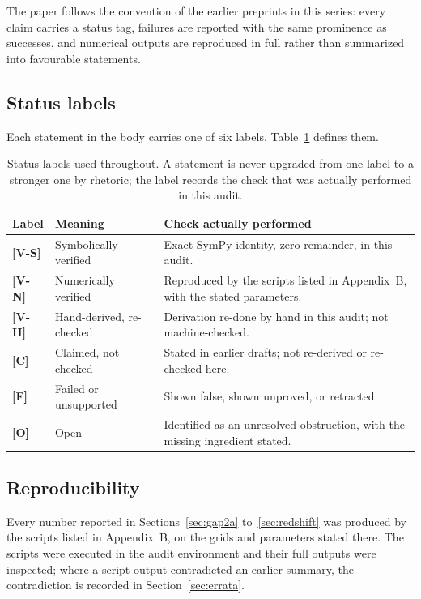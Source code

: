 \documentclass[11pt, a4paper]{article}
\newcommand{\VS}{\textcolor{vs}{\textbf{[V-S]}}}
\newcommand{\VN}{\textcolor{vn}{\textbf{[V-N]}}}
\newcommand{\VH}{\textcolor{vh}{\textbf{[V-H]}}}
\newcommand{\CC}{\textcolor{cc}{\textbf{[C]}}}
\newcommand{\FF}{\textcolor{ff}{\textbf{[F]}}}
\newcommand{\OO}{\textcolor{oo}{\textbf{[O]}}}
\theoremstyle{remark}
\theoremstyle{definition}
\begin{document}
The paper follows the convention of the earlier preprints in this series: every claim carries a status tag, failures are reported with the same prominence as successes, and numerical outputs are reproduced in full rather than summarized into favourable statements.

\subsection{Status labels}

Each statement in the body carries one of six labels. Table~\ref{tab:status} defines them.

\begin{table}[H]
\centering
\caption{Status labels used throughout. A statement is never upgraded from one label to a stronger one by rhetoric; the label records the check that was actually performed in this audit.}
\label{tab:status}
\begin{tabular}{@{}llp{8.6cm}@{}}
\toprule
Label & Meaning & Check actually performed \\
\midrule
\VS & Symbolically verified & Exact SymPy identity, zero remainder, in this audit. \\
\VN & Numerically verified & Reproduced by the scripts listed in Appendix~B, with the stated parameters. \\
\VH & Hand-derived, re-checked & Derivation re-done by hand in this audit; not machine-checked. \\
\CC & Claimed, not checked & Stated in earlier drafts; not re-derived or re-checked here. \\
\FF & Failed or unsupported & Shown false, shown unproved, or retracted. \\
\OO & Open & Identified as an unresolved obstruction, with the missing ingredient stated. \\
\bottomrule
\end{tabular}
\end{table}

\subsection{Reproducibility}

Every number reported in Sections~\ref{sec:gap2a} to~\ref{sec:redshift} was produced by the scripts listed in Appendix~B, on the grids and parameters stated there. The scripts were executed in the audit environment and their full outputs were inspected; where a script output contradicted an earlier summary, the contradiction is recorded in Section~\ref{sec:errata}.
\end{document}
